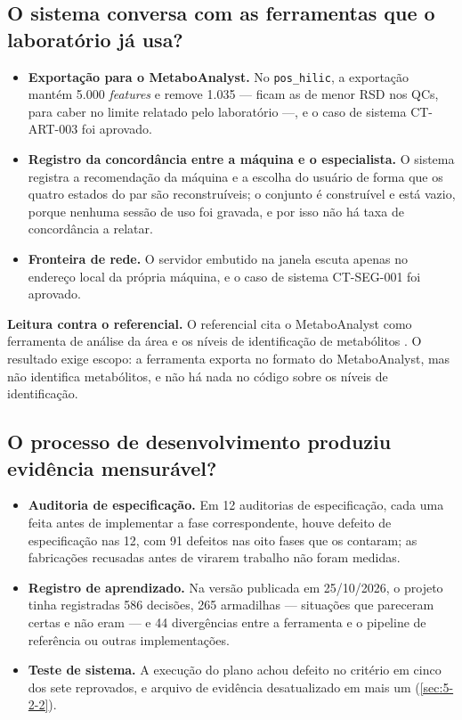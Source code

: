 \subsection{O sistema conversa com as ferramentas que o laboratório já usa?}\label{sec:5-3-5}

\begin{itemize}
\item \textbf{Exportação para o MetaboAnalyst.} No \texttt{pos\_\allowbreak{}hilic}, a exportação mantém 5.000 \textit{features} e remove 1.035 --- ficam as de menor RSD nos QCs, para caber no limite relatado pelo laboratório ---, e o caso de sistema CT-ART-003 foi aprovado.
\item \textbf{Registro da concordância entre a máquina e o especialista.} O sistema registra a recomendação da máquina e a escolha do usuário de forma que os quatro estados do par são reconstruíveis; o conjunto é construível e está vazio, porque nenhuma sessão de uso foi gravada, e por isso não há taxa de concordância a relatar.
\item \textbf{Fronteira de rede.} O servidor embutido na janela escuta apenas no endereço local da própria máquina, e o caso de sistema CT-SEG-001 foi aprovado.
\end{itemize}


\textbf{Leitura contra o referencial.} O referencial cita o MetaboAnalyst como ferramenta de análise da área \cite{pang2024metaboanalyst} e os níveis de identificação de metabólitos \cite{sumner2007proposed}. O resultado exige escopo: a ferramenta exporta no formato do MetaboAnalyst, mas não identifica metabólitos, e não há nada no código sobre os níveis de identificação.

\subsection{O processo de desenvolvimento produziu evidência mensurável?}\label{sec:5-3-6}

\begin{itemize}
\item \textbf{Auditoria de especificação.} Em 12 auditorias de especificação, cada uma feita antes de implementar a fase correspondente, houve defeito de especificação nas 12, com 91 defeitos nas oito fases que os contaram; as fabricações recusadas antes de virarem trabalho não foram medidas.
\item \textbf{Registro de aprendizado.} Na versão publicada em 25/10/2026, o projeto tinha registradas 586 decisões, 265 armadilhas --- situações que pareceram certas e não eram --- e 44 divergências entre a ferramenta e o pipeline de referência ou outras implementações.
\item \textbf{Teste de sistema.} A execução do plano achou defeito no critério em cinco dos sete reprovados, e arquivo de evidência desatualizado em mais um (\ref{sec:5-2-2}).
\end{itemize}


